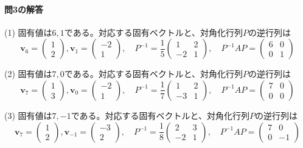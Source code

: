 \paragraph{問3の解答}
(1) 固有値は$6, 1$である。対応する固有ベクトルと、対角化行列$P$の逆行列は
\[
\bm{v}_{6} = 
\begin{pmatrix}
1 \\
2
\end{pmatrix}, 
\bm{v}_{1} = 
\begin{pmatrix}
-2 \\
1
\end{pmatrix}, \quad
P^{-1} = 
\frac{1}{5}
\begin{pmatrix}
1 & 2 \\
-2 & 1
\end{pmatrix}, \quad
P^{-1} AP =
\begin{pmatrix}
6 & 0 \\
0 & 1
\end{pmatrix}
\]

\noindent (2) 固有値は$7, 0$である。対応する固有ベクトルと、対角化行列$P$の逆行列は
\[
\bm{v}_{7} = 
\begin{pmatrix}
1 \\
3
\end{pmatrix}, 
\bm{v}_{0} = 
\begin{pmatrix}
-2 \\
1
\end{pmatrix}, \quad
P^{-1} = 
\frac{1}{7}
\begin{pmatrix}
1 & 2 \\
-3 & 1
\end{pmatrix}, \quad
P^{-1} AP =
\begin{pmatrix}
7 & 0 \\
0 & 0
\end{pmatrix}
\]

\noindent (3) 固有値は$7, -1$である。対応する固有ベクトルと、対角化行列$P$の逆行列は
\[
\bm{v}_{7} = 
\begin{pmatrix}
1 \\
2
\end{pmatrix}, 
\bm{v}_{-1} = 
\begin{pmatrix}
-3 \\
2
\end{pmatrix}, \quad
P^{-1} = 
\frac{1}{8}
\begin{pmatrix}
2 & 3 \\
-2 & 1
\end{pmatrix}, \quad
P^{-1} AP =
\begin{pmatrix}
7 & 0 \\
0 & -1
\end{pmatrix}
\]

